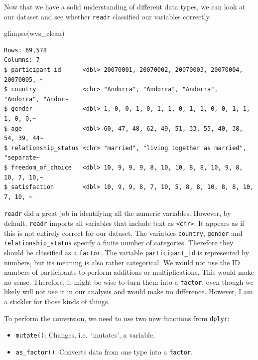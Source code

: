 \documentclass[
  letterpaper,
]{krantz}
\makeatletter
\newenvironment{Shaded}{\begin{snugshade}}{\end{snugshade}}
\newcommand{\FunctionTok}[1]{\textcolor[rgb]{0.28,0.35,0.67}{#1}}
\newcommand{\NormalTok}[1]{\textcolor[rgb]{0.00,0.23,0.31}{#1}}
\newenvironment{kframe}{%
\medskip{}
\setlength{\fboxsep}{.8em}
 \def\at@end@of@kframe{}%
 \ifinner\ifhmode%
  \def\at@end@of@kframe{\end{minipage}}%
  \begin{minipage}{\columnwidth}%
 \fi\fi%
 \def\FrameCommand##1{\hskip\@totalleftmargin \hskip-\fboxsep
 \colorbox{shadecolor}{##1}\hskip-\fboxsep
     \hskip-\linewidth \hskip-\@totalleftmargin \hskip\columnwidth}%
 \MakeFramed {\advance\hsize-\width
   \@totalleftmargin\z@ \linewidth\hsize
   \@setminipage}}%
 {\par\unskip\endMakeFramed%
 \at@end@of@kframe}
\renewenvironment{Shaded}{\begin{kframe}}{\end{kframe}}
\makeatother
\begin{document}
Now that we have a solid understanding of different data types, we can
look at our dataset and see whether \texttt{readr} classified our
variables correctly.

\begin{Shaded}
\begin{Highlighting}[]
\FunctionTok{glimpse}\NormalTok{(wvs\_clean)}
\end{Highlighting}
\end{Shaded}

\begin{verbatim}
Rows: 69,578
Columns: 7
$ participant_id      <dbl> 20070001, 20070002, 20070003, 20070004, 20070005, ~
$ country             <chr> "Andorra", "Andorra", "Andorra", "Andorra", "Andor~
$ gender              <dbl> 1, 0, 0, 1, 0, 1, 1, 0, 1, 1, 0, 0, 1, 1, 1, 0, 0,~
$ age                 <dbl> 60, 47, 48, 62, 49, 51, 33, 55, 40, 38, 54, 39, 44~
$ relationship_status <chr> "married", "living together as married", "separate~
$ freedom_of_choice   <dbl> 10, 9, 9, 9, 8, 10, 10, 8, 8, 10, 9, 8, 10, 7, 10,~
$ satisfaction        <dbl> 10, 9, 9, 8, 7, 10, 5, 8, 8, 10, 8, 8, 10, 7, 10, ~
\end{verbatim}

\texttt{readr} did a great job in identifying all the numeric variables.
However, by default, \texttt{readr} imports all variables that include
text as \texttt{\textless{}chr\textgreater{}}. It appears as if this is
not entirely correct for our dataset. The variables \texttt{country},
\texttt{gender} and \texttt{relationship\_status} specify a finite
number of categories. Therefore they should be classified as a
\texttt{factor}. The variable \texttt{participant\_id} is represented by
numbers, but its meaning is also rather categorical. We would not use
the ID numbers of participants to perform additions or multiplications.
This would make no sense. Therefore, it might be wise to turn them into
a \texttt{factor}, even though we likely will not use it in our analysis
and would make no difference. However, I am a stickler for those kinds
of things.

To perform the conversion, we need to use two new functions from
\texttt{dplyr}:

\begin{itemize}
\item
  \texttt{mutate()}: Changes, i.e.~`mutates', a variable.
\item
  \texttt{as\_factor()}: Converts data from one type into a
  \texttt{factor}.
\end{itemize}
\end{document}
